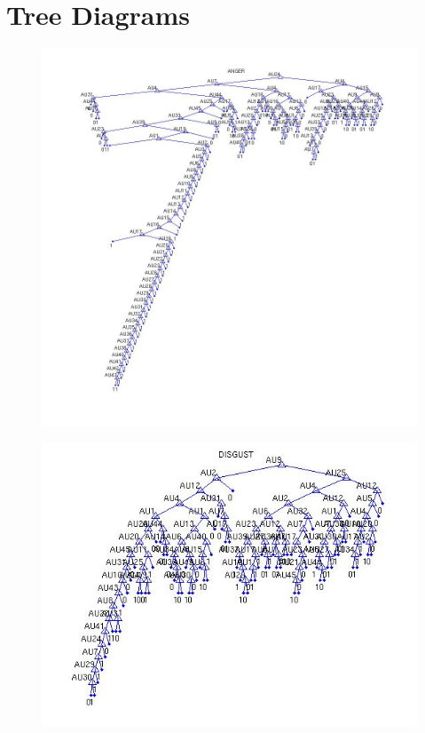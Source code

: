 \documentclass[11pt]{amsart}
\begin{document}
\section{Tree Diagrams}
\begin{figure}[h]
\begin{center}
\includegraphics[scale=0.4]{anger.jpg}
\end{center}
\end{figure}

\begin{figure}[h]
\begin{center}
\includegraphics[scale=0.7]{disgust.jpg}
\end{center}
\end{figure}
\end{document}
